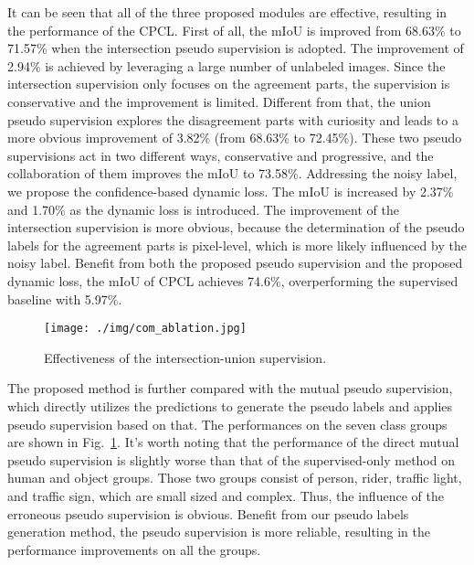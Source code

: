\documentclass[journal]{IEEEtran}
\begin{document}
It can be seen that all of the three proposed modules are effective, resulting in the performance of the CPCL. First of all, the mIoU is improved from 68.63\% to 71.57\% 
when the intersection pseudo supervision is adopted. The improvement of 2.94\% is achieved by leveraging a large number of unlabeled images. Since the intersection 
supervision only focuses on the agreement parts, the supervision is conservative and the improvement is limited. Different from that, the union pseudo supervision explores 
the disagreement parts with curiosity and leads to a more obvious improvement of 3.82\% (from 68.63\% to 72.45\%). These two pseudo supervisions act in two different ways, 
conservative and progressive, and the collaboration of them improves the mIoU to 73.58\%. Addressing the noisy label, we propose the confidence-based dynamic loss. The mIoU is 
increased by 2.37\% and 1.70\% as the dynamic loss is introduced. The improvement of the intersection supervision is more obvious, because the determination of the pseudo 
labels for the agreement parts is pixel-level, which is more likely influenced by the noisy label. Benefit from both the proposed pseudo supervision and the proposed 
dynamic loss, the mIoU of CPCL achieves 74.6\%, overperforming the supervised baseline with 5.97\%.

\begin{figure}[h]
  \centering
  \texttt{[image: ./img/com\_ablation.jpg]}
  \caption{Effectiveness of the intersection-union supervision.}
  \label{fig:com_ablation}
\end{figure}

The proposed method is further compared with the mutual pseudo supervision, which directly utilizes the predictions to generate the pseudo labels and 
applies pseudo supervision based on that. The performances on the seven class groups are shown in Fig.~\ref{fig:com_ablation}. It's worth noting that the 
performance of the direct mutual pseudo supervision is slightly worse than that of the supervised-only method on human and object groups. Those two 
groups consist of person, rider, traffic light, and traffic sign, which are small sized and complex. Thus, the influence of the erroneous pseudo supervision is 
obvious. Benefit from our pseudo labels generation method, the pseudo supervision is more reliable, resulting in the performance improvements on all the groups.
\end{document}
